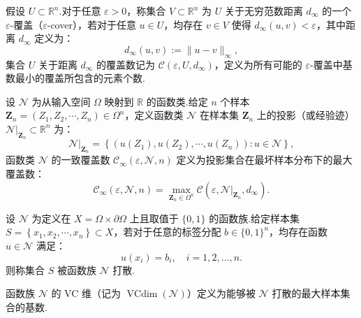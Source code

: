 \begin{definition}\label{def:staerr:cover}
假设 $U \subset \mathbb{R}^{n}$.对于任意 $\varepsilon > 0$，称集合 $V \subset \mathbb{R}^{n}$ 为 $U$ 关于无穷范数距离 $d_{\infty}$ 的一个 $\varepsilon$-覆盖（$\varepsilon$-cover），若对于任意 $u \in U$，均存在 $v \in V$ 使得 $d_{\infty}(u, v)<\varepsilon$，其中距离 $d_{\infty}$ 定义为：
$$d_{\infty}(u, v):=\|u-v\|_{\infty},$$
集合 $U$ 关于距离 $d_{\infty}$ 的覆盖数记为 $\mathcal{C}(\varepsilon, U, d_{\infty})$，定义为所有可能的 $\varepsilon$-覆盖中基数最小的覆盖所包含的元素个数.
\end{definition}

\begin{definition}\label{def:staerr:unicovnum}
设 $\mathcal{N}$ 为从输入空间 $\Omega$ 映射到 $\mathbb{R}$ 的函数类.给定 $n$ 个样本 $\mathbf{Z}_{n}=\left(Z_{1}, Z_{2}, \cdots, Z_{n}\right) \in \Omega^{n}$，定义函数类 $\mathcal{N}$ 在样本集 $\mathbf{Z}_{n}$ 上的投影（或经验迹） $\left.\mathcal{N}\right|_{\mathbf{Z}_{n}} \subset \mathbb{R}^{n}$ 为：
$$\left.\mathcal{N}\right|_{\mathbf{Z}_{n}}=\left\{\left(u(Z_{1}), u(Z_{2}), \cdots, u(Z_{n})\right): u \in \mathcal{N}\right\},$$
函数类 $\mathcal{N}$ 的一致覆盖数 $\mathcal{C}_{\infty}(\varepsilon, \mathcal{N}, n)$ 定义为投影集合在最坏样本分布下的最大覆盖数：
$$\mathcal{C}_{\infty}(\varepsilon, \mathcal{N}, n)=\max_{\mathbf{Z}_{n} \in \Omega^{n}} \mathcal{C}\left(\varepsilon, \left.\mathcal{N}\right|_{\mathbf{Z}_{n}}, d_{\infty}\right).$$
\end{definition}

\begin{definition}[打散，Shattering]\label{def:staerr:shatter}
设 $\mathcal{N}$ 为定义在 $X=\Omega \times \partial\Omega$ 上且取值于 $\{0,1\}$ 的函数族.给定样本集 $S=\left\{x_{1}, x_{2}, \cdots, x_{n}\right\} \subset X$，若对于任意的标签分配 $b \in\{0,1\}^{n}$，均存在函数 $u \in \mathcal{N}$ 满足：
\begin{equation*}
u\left(x_{i}\right)=b_{i}, \quad i=1,2, \ldots, n.
\end{equation*}
则称集合 $S$ 被函数族 $\mathcal{N}$ 打散.
\end{definition}

\begin{definition}[VC 维，VC Dimension]\label{def:staerr:vc_dim}
函数族 $\mathcal{N}$ 的 VC 维（记为 $\operatorname{VCdim}(\mathcal{N})$）定义为能够被 $\mathcal{N}$ 打散的最大样本集合的基数.
\end{definition}

